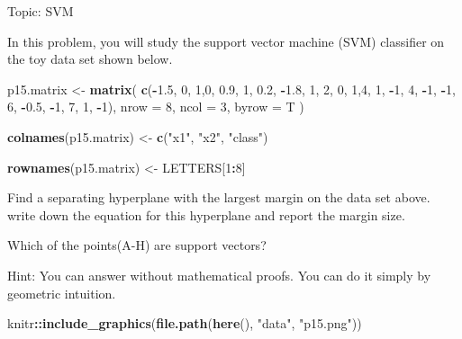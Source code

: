 \documentclass[
]{article}
\newenvironment{Shaded}{\begin{snugshade}}{\end{snugshade}}
\newcommand{\AttributeTok}[1]{\textcolor[rgb]{0.13,0.29,0.53}{#1}}
\newcommand{\DecValTok}[1]{\textcolor[rgb]{0.00,0.00,0.81}{#1}}
\newcommand{\FloatTok}[1]{\textcolor[rgb]{0.00,0.00,0.81}{#1}}
\newcommand{\FunctionTok}[1]{\textcolor[rgb]{0.13,0.29,0.53}{\textbf{#1}}}
\newcommand{\NormalTok}[1]{#1}
\newcommand{\OtherTok}[1]{\textcolor[rgb]{0.56,0.35,0.01}{#1}}
\newcommand{\SpecialCharTok}[1]{\textcolor[rgb]{0.81,0.36,0.00}{\textbf{#1}}}
\newcommand{\StringTok}[1]{\textcolor[rgb]{0.31,0.60,0.02}{#1}}
\begin{document}
Topic: SVM

In this problem, you will study the support vector machine (SVM)
classifier on the toy data set shown below.

\begin{Shaded}
\begin{Highlighting}[]
\NormalTok{p15.matrix }\OtherTok{\textless{}{-}} 
  \FunctionTok{matrix}\NormalTok{(}
    \FunctionTok{c}\NormalTok{(}\SpecialCharTok{{-}}\FloatTok{1.5}\NormalTok{, }\DecValTok{0}\NormalTok{, }\DecValTok{1}\NormalTok{,}\DecValTok{0}\NormalTok{, }\FloatTok{0.9}\NormalTok{, }\DecValTok{1}\NormalTok{, }\FloatTok{0.2}\NormalTok{, }\SpecialCharTok{{-}}\FloatTok{1.8}\NormalTok{, }\DecValTok{1}\NormalTok{, }\DecValTok{2}\NormalTok{, }\DecValTok{0}\NormalTok{, }\DecValTok{1}\NormalTok{,}\DecValTok{4}\NormalTok{, }\DecValTok{1}\NormalTok{, }\SpecialCharTok{{-}}\DecValTok{1}\NormalTok{, }\DecValTok{4}\NormalTok{, }\SpecialCharTok{{-}}\DecValTok{1}\NormalTok{, }\SpecialCharTok{{-}}\DecValTok{1}\NormalTok{, }\DecValTok{6}\NormalTok{, }\SpecialCharTok{{-}}\FloatTok{0.5}\NormalTok{, }\SpecialCharTok{{-}}\DecValTok{1}\NormalTok{,  }\DecValTok{7}\NormalTok{, }\DecValTok{1}\NormalTok{, }\SpecialCharTok{{-}}\DecValTok{1}\NormalTok{),}
    \AttributeTok{nrow =} \DecValTok{8}\NormalTok{, }\AttributeTok{ncol =} \DecValTok{3}\NormalTok{, }\AttributeTok{byrow =}\NormalTok{ T}
\NormalTok{  )}

\FunctionTok{colnames}\NormalTok{(p15.matrix) }\OtherTok{\textless{}{-}} \FunctionTok{c}\NormalTok{(}\StringTok{"x1"}\NormalTok{, }\StringTok{"x2"}\NormalTok{, }\StringTok{"class"}\NormalTok{)}

\FunctionTok{rownames}\NormalTok{(p15.matrix) }\OtherTok{\textless{}{-}}\NormalTok{ LETTERS[}\DecValTok{1}\SpecialCharTok{:}\DecValTok{8}\NormalTok{]}
\end{Highlighting}
\end{Shaded}

Find a separating hyperplane with the largest margin on the data set
above. write down the equation for this hyperplane and report the margin
size.

Which of the points(A-H) are support vectors?

Hint: You can answer without mathematical proofs. You can do it simply
by geometric intuition.

\begin{Shaded}
\begin{Highlighting}[]
\NormalTok{knitr}\SpecialCharTok{::}\FunctionTok{include\_graphics}\NormalTok{(}\FunctionTok{file.path}\NormalTok{(}\FunctionTok{here}\NormalTok{(), }\StringTok{"data"}\NormalTok{, }\StringTok{"p15.png"}\NormalTok{)) }
\end{Highlighting}
\end{Shaded}
\end{document}
